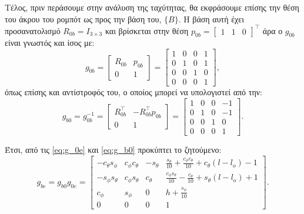 \documentclass[12pt]{article} %
\numberwithin{equation}{section}  %
\begin{document}
Τέλος, πριν περάσουμε στην ανάλυση της ταχύτητας, θα εκφράσουμε επίσης την θέση του άκρου του ρομπότ ως προς την βάση του, $\{B\}$.
Η βάση αυτή έχει προσανατολισμό $R_{0b} = I_{3 \times 3}$ και βρίσκεται στην θέση 
$p_{0b} = \begin{bmatrix} 1 & 1 & 0 \end{bmatrix}^{\top}$\textemdash 
άρα ο $g_{0b}$ είναι γνωστός και ίσος με:
\begin{equation} \label{eq:g_0b}
    g_{0b} = \begin{bmatrix} R_{0b} & p_{0b}  \\ 0 & 1\end{bmatrix} = 
    \begin{bmatrix} 
        1   &  0  &  0  &  1  \\
        0   &  1  &  0  &  1  \\
        0   &  0  &  1  &  0  \\
        0   &  0  &  0  &  1  
    \end{bmatrix},
\end{equation}
όπως επίσης και αντίστροφός του, ο οποίος μπορεί να υπολογιστεί από την:
\begin{equation} \label{eq:g_b0}
    g_{b0} = g_{0b}^{-1}
    = \begin{bmatrix} R_{0b}^{\top} & - R_{0b}^{\top} p_{0b}  \\ 0 & 1\end{bmatrix} = 
    \begin{bmatrix} 
        1   &  0  &  0  &  -1  \\
        0   &  1  &  0  &  -1  \\
        0   &  0  &  1  &  0  \\
        0   &  0  &  0  &  1  
    \end{bmatrix}.
\end{equation}

Έτσι, από τις \eqref{eq:g_0e} και \eqref{eq:g_b0} προκύπτει το ζητούμενο:
\begin{equation} \label{eq:g_be}
    g_{be} = g_{b0} g_{0e} = \begin{bmatrix} 
        -c_{\theta} s_{\phi} & c_{\phi} c_{\theta} & -s_{\theta} & \frac{s_{\theta}}{10} + \frac{c_{\phi} c_{\theta}}{10} + c_{\theta}(l - l_o) - 1 \\
        -s_{\phi} s_{\theta} & c_{\phi} s_{\theta} & c_{\theta} & \frac{c_{\phi} s_{\theta}}{10} - \frac{c_{\theta}}{10} + s_{\theta}(l - l_o) + 1 \\
        c_{\phi} & s_{\phi} & 0 & h + \frac{s_{\phi}}{10} \\
        0 & 0 & 0 & 1
    \end{bmatrix}.
\end{equation} 
\end{document}
